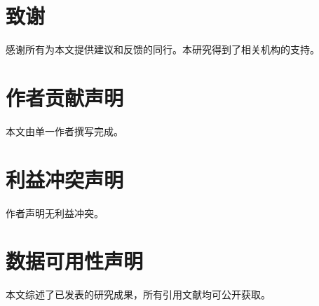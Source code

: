 \section*{致谢}

感谢所有为本文提供建议和反馈的同行。本研究得到了相关机构的支持。

\section*{作者贡献声明}

本文由单一作者撰写完成。

\section*{利益冲突声明}

作者声明无利益冲突。

\section*{数据可用性声明}

本文综述了已发表的研究成果，所有引用文献均可公开获取。
